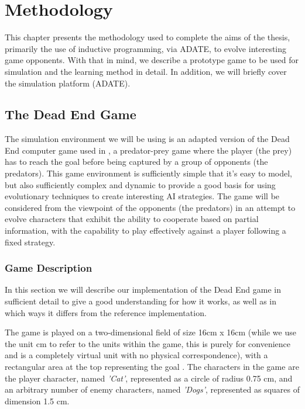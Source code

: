 \cleardoublepage
\chapter{Methodology}
\label{methodology}

This chapter presents the methodology used to complete the aims of the thesis,
primarily the use of inductive programming, via ADATE, to evolve interesting
game opponents. With that in mind, we describe a prototype game to be used for
simulation and the learning method in detail. In addition, we will briefly cover
the simulation platform (ADATE).

\section{The Dead End Game}
\label{sec:game}

The simulation environment we will be using is an adapted version of the Dead
End computer game used in \citet{yannakakis2005ai}, a predator-prey game where
the player (the prey) has to reach the goal before being captured by a group of
opponents (the predators). This game environment is sufficiently simple that
it's easy to model, but also sufficiently complex and dynamic to provide a good
basis for using evolutionary techniques to create interesting AI strategies. The
game will be considered from the viewpoint of the opponents (the predators) in
an attempt to evolve characters that exhibit the ability to cooperate based on
partial information, with the capability to play effectively against a player
following a fixed strategy.

\subsection{Game Description}
\label{sec:game-description}

In this section we will describe our implementation of the Dead End game in
sufficient detail to give a good understanding for how it works, as well as in
which ways it differs from the reference implementation.
\citep[see][Chap.~5]{yannakakis2005ai}

The game is played on a two-dimensional field of size 16cm x 16cm (while we use
the unit cm to refer to the units within the game, this is purely for
convenience and is a completely virtual unit with no physical correspondence),
with a rectangular area at the top representing the goal . The characters in the game are the player character, named
\emph{'Cat'}, represented as a circle of radius 0.75 cm, and an arbitrary number
of enemy characters, named \emph{'Dogs'}, represented as squares of dimension
1.5 cm.

